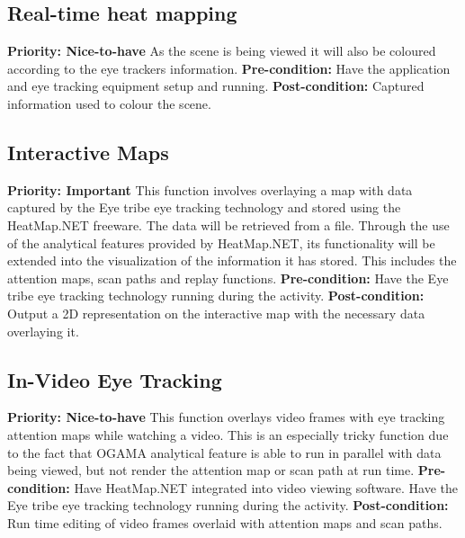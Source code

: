 \subsection{Real-time heat mapping}
    \textbf{Priority: Nice-to-have}\newline
    As the scene is being viewed it will also be coloured according to the eye trackers information.\newline
    \textbf{Pre-condition: }
    Have the application and eye tracking equipment setup and running.\newline
    \textbf{Post-condition: }
    Captured information used to colour the scene.
    
\subsection{Interactive Maps}
    \textbf{Priority: Important}\newline
    This function involves overlaying a map with data captured by the Eye tribe eye tracking technology and stored using the HeatMap.NET freeware. The data will be retrieved from a file. Through the use of the analytical features provided by HeatMap.NET, its functionality will be extended into the visualization of the information it has stored. This includes the attention maps, scan paths and replay functions.\newline
    \textbf{Pre-condition: } Have the Eye tribe eye tracking technology running during the activity.\newline   
    \textbf{Post-condition: }Output a 2D representation on the interactive map with the necessary data overlaying it. 
    
\subsection{In-Video Eye Tracking}
    \textbf{Priority: Nice-to-have}\newline
    This function overlays video frames with eye tracking attention maps while watching a video. This is an especially tricky function due to the fact that OGAMA analytical feature is able to run in parallel with data being viewed, but not render the attention map or scan path at run time.\newline
    \textbf{Pre-condition: }Have HeatMap.NET integrated into video viewing software. Have the Eye tribe eye tracking technology running during the activity.\newline
    \textbf{Post-condition: }Run time editing of video frames overlaid with attention maps and scan paths.

